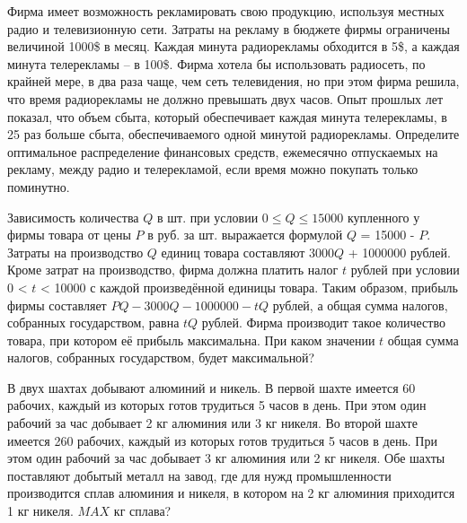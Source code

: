  Фирма имеет возможность рекламировать свою продукцию, используя местных радио и телевизионную сети. Затраты на рекламу в бюджете фирмы ограничены величиной 1000\$ в
месяц. Каждая минута радиорекламы обходится в 5\$, а каждая минута телерекламы – в 100\$.
Фирма хотела бы использовать радиосеть, по крайней мере, в два раза чаще, чем сеть телевидения, но при этом фирма решила, что время радиорекламы не должно превышать двух
часов. Опыт прошлых лет показал, что объем сбыта, который обеспечивает каждая минута телерекламы, в 25 раз больше сбыта, обеспечиваемого одной минутой радиорекламы. Определите
оптимальное распределение финансовых средств, ежемесячно отпускаемых на рекламу, между
радио и телерекламой, если время можно покупать только поминутно.

 Зависимость количества $Q$ в шт. при условии $0 \leqslant Q \leqslant 15000$ купленного у фирмы товара
от цены $P$ в руб. за шт. выражается формулой $Q$ = 15000 - $P$. Затраты на производство $Q$ единиц
товара составляют $3000Q$ + 1000000 рублей. Кроме затрат на производство, фирма должна
платить налог $t$ рублей при условии 0 < $t$ < 10000 с каждой произведённой единицы товара.
Таким образом, прибыль фирмы составляет $PQ - 3000Q - 1000000 - tQ$ рублей, а общая сумма
налогов, собранных государством, равна $tQ$ рублей.
Фирма производит такое количество товара, при котором её прибыль максимальна. При
каком значении $t$ общая сумма налогов, собранных государством, будет максимальной?

 В двух шахтах добывают алюминий и никель. В первой шахте имеется 60 рабочих, каждый из которых готов трудиться 5 часов в день. При этом один рабочий за час добывает 2 кг
алюминия или 3 кг никеля. Во второй шахте имеется 260 рабочих, каждый из которых готов
трудиться 5 часов в день. При этом один рабочий за час добывает 3 кг алюминия или 2 кг
никеля.
Обе шахты поставляют добытый металл на завод, где для нужд промышленности производится сплав алюминия и никеля, в котором на 2 кг алюминия приходится 1 кг никеля. $MAX$ кг сплава?

